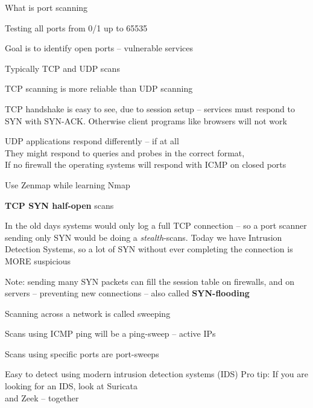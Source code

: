 \documentclass[Screen16to9,17pt]{foils}
\begin{document}

What is port scanning
\begin{list2}
\item Testing all ports from 0/1 up to 65535
\item Goal is to identify open ports -- vulnerable services
\item Typically TCP and UDP scans
\item TCP scanning is more reliable than UDP scanning
\item TCP handshake is easy to see, due to session setup -- services must respond to SYN with SYN-ACK. Otherwise client programs like browsers will not work
\item UDP applications respond differently -- if at all\\
They might respond to queries and probes in the correct format, \\
If no firewall the operating systems will respond with ICMP on closed ports
\item Use Zenmap while learning Nmap
\end{list2}




\begin{list2}
\item {\bfseries TCP SYN half-open} scans
\item In the old days systems would only log a full TCP connection
  -- so a port scanner sending only SYN would be doing a \emph{stealth}-scans. Today we have Intrusion Detection Systems, so a lot of SYN without ever completing the connection is MORE suspicious
\item Note: sending many SYN packets can fill the session table on firewalls, and on servers -- preventing new connections -- also called {\bfseries SYN-flooding}
\end{list2}



\begin{list1}
\item Scanning across a network is called sweeping
\item Scans using ICMP ping will be a ping-sweep -- active IPs
\item Scans using specific ports are port-sweeps
\item Easy to detect using modern intrusion detection systems (IDS)
\vskip 2cm
Pro tip: If you are looking for an IDS, look at Suricata \\
and Zeek  -- together
\end{list1}
\end{document}

